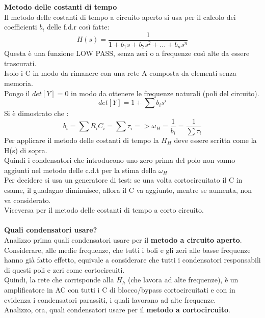 \documentclass{article}
\begin{document}
\textbf{Metodo delle costanti di tempo}\\
Il metodo delle costanti di tempo a circuito aperto si usa per il calcolo dei coefficienti $b_{i}$ delle f.d.r così fatte:
\begin{equation}
    H(s)=\frac{1}{1+b_{1}s+b_{2}s^2+...+b_{n}s^n}
\end{equation}
Questa è una funzione LOW PASS, senza zeri o a frequenze così alte da essere trascurati.\\
Isolo i C in modo da rimanere con una rete A composta da elementi senza memoria.\\
Pongo il $det[Y]=0$ in modo da ottenere le frequenze naturali (poli del circuito).
\begin{equation}
    det[Y]=1+\sum b_{i}s^i
\end{equation}
Si è dimostrato che :
\begin{equation}
    b_{i}=\sum R_{i}C_{i} = \sum \tau_{i} => \omega_{H}=\frac{1}{b_{i}}=\frac{1}{\sum \tau_{i}}
\end{equation}
Per applicare il metodo delle costanti di tempo la $H_{H}$ deve essere scritta come la H(s) di sopra.\\
Quindi i condensatori che introducono uno zero prima del polo non vanno aggiunti nel metodo delle c.d.t per la stima della $\omega_{H}$\\
Per decidere si usa un generatore di test: se una volta cortocircuitato il C in esame, il guadagno diminuisce, allora il C va aggiunto, mentre se aumenta, non va considerato.\\
Viceversa per il metodo delle costanti di tempo a corto circuito.\\\\
\textbf{Quali condensatori usare?} \\
Analizzo prima quali condensatori usare per il \textbf{metodo a circuito aperto}.\\
Considerare, alle medie frequenze, che tutti i boli e gli zeri alle basse frequenze hanno già fatto effetto, equivale a considerare che tutti i condensatori responsabili di questi poli e zeri come cortocircuiti. \\ Quindi, la rete che corrisponde alla $ H_{h} $ (che lavora ad alte frequenze), è un amplificatore in AC con tutti i C di blocco/bypass cortocircuitati e con in evidenza i condensatori parassiti, i quali lavorano ad alte frequenze. \\
Analizzo, ora, quali condensatori usare per il \textbf{metodo a cortocircuito}.\\
\end{document}
